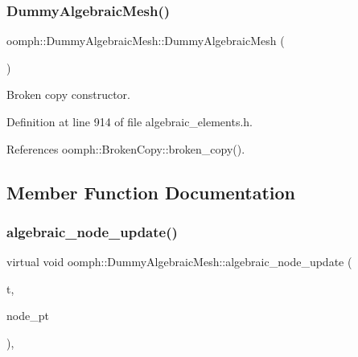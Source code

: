 \subsubsection{\texorpdfstring{Dummy\+Algebraic\+Mesh()}{DummyAlgebraicMesh()}\hspace{0.1cm}{\footnotesize\ttfamily [2/2]}}
{\footnotesize\ttfamily oomph\+::\+Dummy\+Algebraic\+Mesh\+::\+Dummy\+Algebraic\+Mesh (\begin{DoxyParamCaption}\item[{const \hyperlink{classoomph_1_1DummyAlgebraicMesh}{Dummy\+Algebraic\+Mesh} \&}]{ }\end{DoxyParamCaption})\hspace{0.3cm}{\ttfamily [inline]}}



Broken copy constructor. 



Definition at line 914 of file algebraic\+\_\+elements.\+h.



References oomph\+::\+Broken\+Copy\+::broken\+\_\+copy().



\subsection{Member Function Documentation}
\mbox{\label{classoomph_1_1DummyAlgebraicMesh_ae13a52cb8561a07233851e2d1db7b4e4}} 
\subsubsection{\texorpdfstring{algebraic\+\_\+node\+\_\+update()}{algebraic\_node\_update()}}
{\footnotesize\ttfamily virtual void oomph\+::\+Dummy\+Algebraic\+Mesh\+::algebraic\+\_\+node\+\_\+update (\begin{DoxyParamCaption}\item[{const unsigned \&}]{t,  }\item[{\hyperlink{classoomph_1_1AlgebraicNode}{Algebraic\+Node} $\ast$\&}]{node\+\_\+pt }\end{DoxyParamCaption})\hspace{0.3cm}{\ttfamily [inline]}, {\ttfamily [virtual]}}



